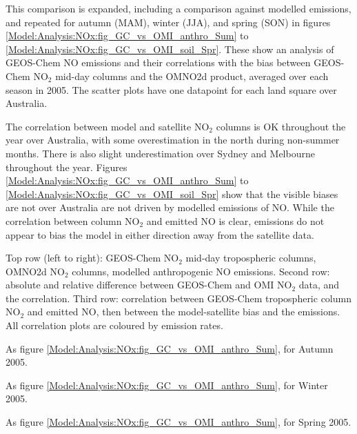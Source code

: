     
    This comparison is expanded, including a comparison against modelled emissions, and repeated for autumn (MAM), winter (JJA), and spring (SON) in figures \ref{Model:Analysis:NOx:fig_GC_vs_OMI_anthro_Sum} to \ref{Model:Analysis:NOx:fig_GC_vs_OMI_soil_Spr}.
    These show an analysis of GEOS-Chem NO emissions and their correlations with the bias between GEOS-Chem NO$_2$ mid-day columns and the OMNO2d product, averaged over each season in 2005.
    The scatter plots have one datapoint for each land square over Australia.
    
    The correlation between model and satellite NO$_2$ columns is OK throughout the year over Australia, with some overestimation in the north during non-summer months.
    There is also slight underestimation over Sydney and Melbourne throughout the year.
    Figures \ref{Model:Analysis:NOx:fig_GC_vs_OMI_anthro_Sum} to \ref{Model:Analysis:NOx:fig_GC_vs_OMI_soil_Spr} show that the visible biases are not over Australia are not driven by modelled emissions of NO.
    While the correlation between column NO$_2$ and emitted NO is clear, emissions do not appear to bias the model in either direction away from the satellite data.
    
      {
        Top row (left to right): GEOS-Chem NO$_2$ mid-day tropospheric columns, OMNO2d NO$_2$ columns, modelled anthropogenic NO emissions. 
        Second row: absolute and relative difference between GEOS-Chem and OMI NO$_2$ data, and the correlation.
        Third row: correlation between GEOS-Chem tropospheric column NO$_2$ and emitted NO, then between the model-satellite bias and the emissions.
        All correlation plots are coloured by emission rates.
      }
      {\label{Model:Analysis:NOx:fig_GC_vs_OMI_anthro_Sum}}
    
      {As figure \ref{Model:Analysis:NOx:fig_GC_vs_OMI_anthro_Sum}, for Autumn 2005.}
      {\label{Model:Analysis:NOx:fig_GC_vs_OMI_anthro_Aut}}
      
      {As figure \ref{Model:Analysis:NOx:fig_GC_vs_OMI_anthro_Sum}, for Winter 2005.}
      {\label{Model:Analysis:NOx:fig_GC_vs_OMI_anthro_Win}}
    
      {As figure \ref{Model:Analysis:NOx:fig_GC_vs_OMI_anthro_Sum}, for Spring 2005.}
      {\label{Model:Analysis:NOx:fig_GC_vs_OMI_anthro_Spr}}

